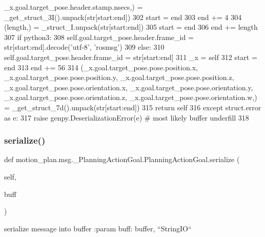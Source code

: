 \begin{DoxyCode}
      \_x.goal.target\_pose.header.stamp.nsecs,) = \_get\_struct\_3I().unpack(str[start:end])
302       start = end
303       end += 4
304       (length,) = \_struct\_I.unpack(str[start:end])
305       start = end
306       end += length
307       \textcolor{keywordflow}{if} python3:
308         self.goal.target\_pose.header.frame\_id = str[start:end].decode(\textcolor{stringliteral}{'utf-8'}, \textcolor{stringliteral}{'rosmsg'})
309       \textcolor{keywordflow}{else}:
310         self.goal.target\_pose.header.frame\_id = str[start:end]
311       \_x = self
312       start = end
313       end += 56
314       (\_x.goal.target\_pose.pose.position.x, \_x.goal.target\_pose.pose.position.y, 
      \_x.goal.target\_pose.pose.position.z, \_x.goal.target\_pose.pose.orientation.x, \_x.goal.target\_pose.pose.orientation.y, 
      \_x.goal.target\_pose.pose.orientation.z, \_x.goal.target\_pose.pose.orientation.w,) = \_get\_struct\_7d().unpack(str[start:end])
315       \textcolor{keywordflow}{return} self
316     \textcolor{keywordflow}{except} struct.error \textcolor{keyword}{as} e:
317       \textcolor{keywordflow}{raise} genpy.DeserializationError(e)  \textcolor{comment}{# most likely buffer underfill}
318 
\end{DoxyCode}
\mbox{\label{classmotion__plan_1_1msg_1_1__PlanningActionGoal_1_1PlanningActionGoal_a08c05b7476118deb2ccd1818f4c5d423}} 
\subsubsection{\texorpdfstring{serialize()}{serialize()}}
{\footnotesize\ttfamily def motion\+\_\+plan.\+msg.\+\_\+\+Planning\+Action\+Goal.\+Planning\+Action\+Goal.\+serialize (\begin{DoxyParamCaption}\item[{}]{self,  }\item[{}]{buff }\end{DoxyParamCaption})}

\begin{DoxyVerb}serialize message into buffer
:param buff: buffer, ``StringIO``
\end{DoxyVerb}
 

